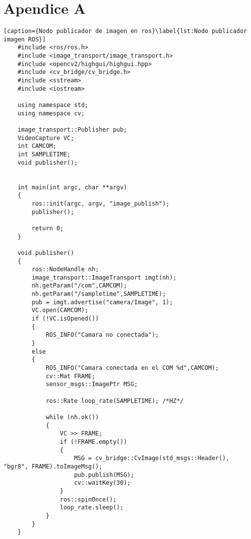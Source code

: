 \chapter{Apendice A}
\begin{lstlisting}[caption={Nodo publicador de imagen en ros}\label{lst:Nodo publicador imagen ROS}]
    #include <ros/ros.h>
    #include <image_transport/image_transport.h>
    #include <opencv2/highgui/highgui.hpp>
    #include <cv_bridge/cv_bridge.h>
    #include <sstream>
    #include <iostream>
    
    using namespace std;
    using namespace cv;
    
    image_transport::Publisher pub;
    VideoCapture VC;
    int CAMCOM;
    int SAMPLETIME;
    void publisher();
    
    
    int main(int argc, char **argv)
    {
        ros::init(argc, argv, "image_publish");
        publisher();
    
        return 0;
    }
    
    void publisher()
    {
        ros::NodeHandle nh;
        image_transport::ImageTransport imgt(nh);
        nh.getParam("/com",CAMCOM);
        nh.getParam("/sampletime",SAMPLETIME);
        pub = imgt.advertise("camera/Image", 1);
        VC.open(CAMCOM); 
        if (!VC.isOpened())
        {
            ROS_INFO("Camara no conectada");
        }
        else
        {
            ROS_INFO("Camara conectada en el COM %d",CAMCOM);
            cv::Mat FRAME;
            sensor_msgs::ImagePtr MSG;
    
            ros::Rate loop_rate(SAMPLETIME); /*HZ*/
    
            while (nh.ok())
            {
                VC >> FRAME;
                if (!FRAME.empty())
                {
                    MSG = cv_bridge::CvImage(std_msgs::Header(), "bgr8", FRAME).toImageMsg();
                    pub.publish(MSG);
                    cv::waitKey(30);
                }
                ros::spinOnce();
                loop_rate.sleep();
            }
        }
    }
\end{lstlisting}

